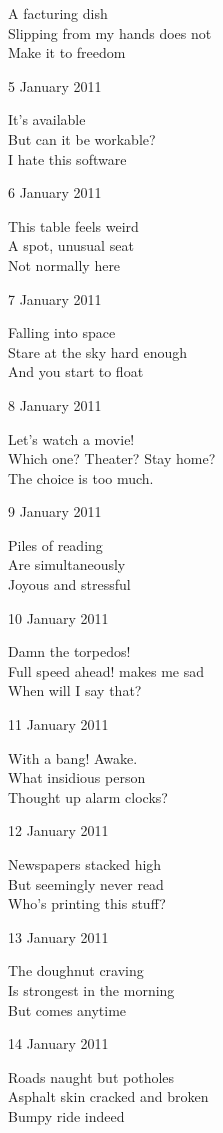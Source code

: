 \documentclass[12pt]{article}
\begin{document}
A facturing dish \\
Slipping from my hands does not \\
Make it to freedom

5 January 2011

It's available \\
But can it be workable? \\
I hate this software

6 January 2011

This table feels weird \\
A spot, unusual seat \\
Not normally here

7 January 2011

Falling into space \\
Stare at the sky hard enough \\
And you start to float

8 January 2011

Let's watch a movie! \\
Which one? Theater? Stay home? \\
The choice is too much.

9 January 2011

Piles of reading \\
Are simultaneously \\
Joyous and stressful

10 January 2011

Damn the torpedos! \\
Full speed ahead! makes me sad \\
When will I say that?

\newpage

11 January 2011

With a bang! Awake. \\
What insidious person \\
Thought up alarm clocks?

12 January 2011

Newspapers stacked high \\
But seemingly never read \\
Who's printing this stuff?

13 January 2011

The doughnut craving \\
Is strongest in the morning \\
But comes anytime

14 January 2011

Roads naught but potholes \\
Asphalt skin cracked and broken \\
Bumpy ride indeed
\end{document}
